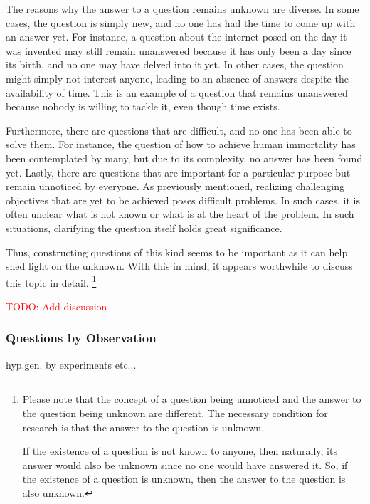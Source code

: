 \documentclass{book}
\begin{document}
The reasons why the answer to a question remains unknown are diverse. In some cases, the question is simply new, and no one has had the time to come up with an answer yet. For instance, a question about the internet posed on the day it was invented may still remain unanswered because it has only been a day since its birth, and no one may have delved into it yet. In other cases, the question might simply not interest anyone, leading to an absence of answers despite the availability of time. This is an example of a question that remains unanswered because nobody is willing to tackle it, even though time exists.

Furthermore, there are questions that are difficult, and no one has been able to solve them. For instance, the question of how to achieve human immortality has been contemplated by many, but due to its complexity, no answer has been found yet. Lastly, there are questions that are important for a particular purpose but remain unnoticed by everyone. As previously mentioned, realizing challenging objectives that are yet to be achieved poses difficult problems. In such cases, it is often unclear what is not known or what is at the heart of the problem. In such situations, clarifying the question itself holds great significance.

Thus, constructing questions of this kind seems to be important as it can help shed light on the unknown. With this in mind, it appears worthwhile to discuss this topic in detail. \footnote{
Please note that the concept of a question being unnoticed and the answer to the question being unknown are different. The necessary condition for research is that the answer to the question is unknown. 

If the existence of a question is not known to anyone, then naturally, its answer would also be unknown since no one would have answered it. So, if the existence of a question is unknown, then the answer to the question is also unknown.
}

\textcolor{red}{TODO: Add discussion}

\subsubsection{Questions by Observation}

hyp.gen. by experiments etc...


\end{document}

